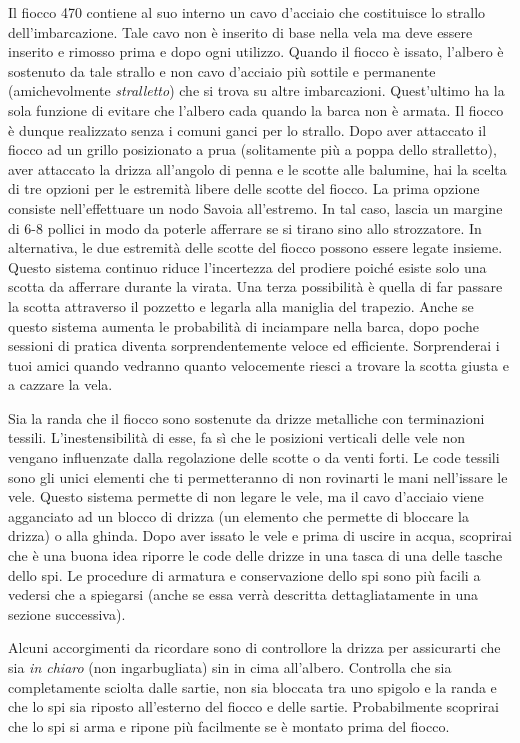 Il fiocco 470 contiene al suo interno un cavo d'acciaio che costituisce lo
strallo dell'imbarcazione. Tale cavo non è inserito di base nella vela ma deve
essere inserito e rimosso prima e dopo ogni utilizzo. Quando il fiocco è issato,
l'albero è sostenuto da tale strallo e non cavo d'acciaio più sottile e
permanente (amichevolmente \emph{stralletto}) che si trova su altre
imbarcazioni. Quest'ultimo ha la sola funzione di evitare che l'albero cada
quando la barca non è armata. Il fiocco è dunque realizzato senza i comuni ganci
per lo strallo. Dopo aver attaccato il fiocco ad un grillo posizionato a prua
(solitamente più a poppa dello stralletto), aver attaccato la drizza all'angolo
di penna e le scotte alle balumine, hai la scelta di tre opzioni per le
estremità libere delle scotte del fiocco. La prima opzione consiste
nell'effettuare un nodo Savoia all'estremo. In tal caso, lascia un margine di
6-8 pollici in modo da poterle afferrare se si tirano sino allo strozzatore. In
alternativa, le due estremità delle scotte del fiocco possono essere legate
insieme. Questo sistema continuo riduce l'incertezza del prodiere poiché esiste
solo una scotta da afferrare durante la virata. Una terza possibilità è quella
di far passare la scotta attraverso il pozzetto e legarla alla maniglia del
trapezio. Anche se questo sistema aumenta le probabilità di inciampare nella
barca, dopo poche sessioni di pratica diventa sorprendentemente veloce ed
efficiente. Sorprenderai i tuoi amici quando vedranno quanto velocemente riesci
a trovare la scotta giusta e a cazzare la vela.

Sia la randa che il fiocco sono sostenute da drizze metalliche con terminazioni
tessili. L'inestensibilità di esse, fa sì che le posizioni verticali delle vele
non vengano influenzate dalla
regolazione delle scotte o da venti forti. Le code tessili sono gli unici
elementi che ti permetteranno di non rovinarti le mani nell'issare le vele.
Questo sistema permette di non legare le vele, ma il cavo d'acciaio viene
agganciato ad un blocco di drizza (un elemento che permette di bloccare la
drizza) o alla ghinda. Dopo aver issato le vele e prima di uscire in acqua, scoprirai che è
una buona idea riporre le code delle drizze in una tasca di una delle tasche
dello spi. Le procedure di armatura e conservazione dello spi sono più facili a
vedersi che a spiegarsi (anche se essa verrà descritta dettagliatamente in una sezione successiva).

Alcuni accorgimenti da ricordare sono di controllore la drizza per assicurarti che sia
\emph{in chiaro} (non ingarbugliata) sin in cima all'albero. Controlla che sia completamente sciolta dalle sartie, non sia
bloccata tra uno spigolo e la randa e che lo spi sia riposto
all'esterno del fiocco e delle sartie. Probabilmente scoprirai che lo spi si
arma e ripone più facilmente se è montato prima del fiocco.

